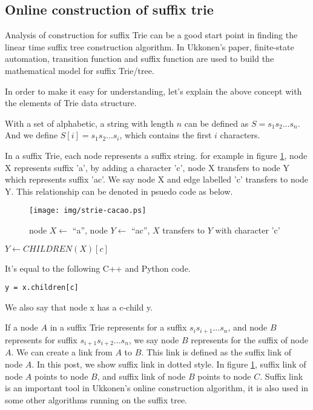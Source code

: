 \documentclass{article}
\begin{document}
\subsection{Online construction of suffix trie}

Analysis of construction for suffix Trie can be a good start point in finding
the linear time suffix tree construction algorithm. In Ukkonen's paper\cite{ukkonen95}, 
finite-state automation, transition function and suffix function are used to 
build the mathematical model for suffix Trie/tree. 

In order to make it easy for understanding, let's explain the above concept with
the elements of Trie data structure.

With a set of alphabetic, a string with length $n$ can be defined as $S=s_1s_2...s_n$.
And we define $S[i]=s_1s_2...s_i$, which contains the first $i$ characters.

In a suffix Trie, each node represents a suffix string. for example in figure 
\ref{fig:strie-cacao}, node X represents suffix 'a', by adding a character 'c',
node X transfers to node Y which represents suffix 'ac'. We say node X and edge labelled 'c'
transfers to node Y. This relationship can be denoted in psuedo code as below.

\begin{figure}[htbp]
   \begin{center}
     \texttt{[image: img/strie-cacao.ps]}
     \caption{node $X \leftarrow$ ``a'', node $Y \leftarrow$ ``ac'', $X$ transfers to $Y$ with character 'c'}
     \label{fig:strie-cacao}
   \end{center}
\end{figure}

$Y \leftarrow CHILDREN(X)[c]$

It's equal to the following C++ and Python code.

\lstset{language=python}
\begin{lstlisting}
y = x.children[c]
\end{lstlisting}

We also say that node x has a c-child y.

If a node $A$ in a suffix Trie represents for a suffix $s_is_{i+1}...s_n$, 
and node $B$ represents for suffix $s_{i+1}s_{i+2}...s_n$, we say node $B$
represents for the suffix of node $A$. We can create a link from $A$ to $B$.
This link is defined as the suffix link of node $A$. In this post, we show
suffix link in dotted style. In figure \ref{fig:strie-cacao}, suffix link of
node $A$ points to node $B$, and suffix link of node $B$ points to node $C$.
Suffix link is an important tool in Ukkonen's online construction algorithm,
it is also used in some other algorithms running on the suffix tree.
\end{document}
